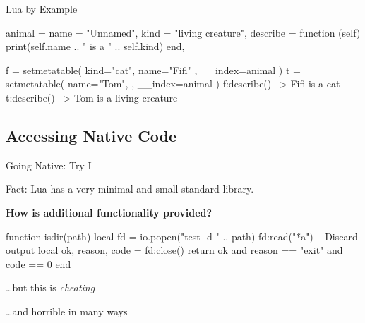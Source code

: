 \documentclass[luatex]{beamer}
\begin{document}
\begin{frame}[fragile]{Lua by Example}
  \begin{luacode}
    animal = {
      name = "Unnamed",
      kind = "living creature",
      describe = function (self)
        print(self.name .. " is a " .. self.kind)
      end,
    }

    f = setmetatable({ kind="cat", name="Fifi" },
                     { __index=animal })
    t = setmetatable({ name="Tom", },
                     { __index=animal })
    f:describe()  --> Fifi is a cat
    t:describe()  --> Tom is a living creature
  \end{luacode}

\end{frame}


\subsection{Accessing Native Code}


\begin{frame}[fragile]{Going Native: Try I}

Fact: Lua has a very minimal and small standard library.

\pause
\textbf{How is additional functionality provided?}

\pause
\vspace{2em}

\begin{luacode}
function isdir(path)
  local fd = io.popen("test -d " .. path)
  fd:read("*a") -- Discard output
  local ok, reason, code = fd:close()
  return ok and reason == "exit" and code == 0
end
\end{luacode}
\vspace{2em}

\pause
\hfill …but this is \emph{cheating}

\pause
\hfill …and horrible in many ways


\end{frame}
\end{document}
